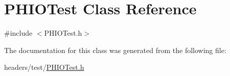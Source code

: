 \hypertarget{class_p_h_i_o_test}{\section{\-P\-H\-I\-O\-Test \-Class \-Reference}
\label{class_p_h_i_o_test}
}


{\ttfamily \#include $<$\-P\-H\-I\-O\-Test.\-h$>$}



\-The documentation for this class was generated from the following file\-:\begin{DoxyCompactItemize}
\item 
headers/test/\hyperlink{_p_h_i_o_test_8h}{\-P\-H\-I\-O\-Test.\-h}\end{DoxyCompactItemize}
